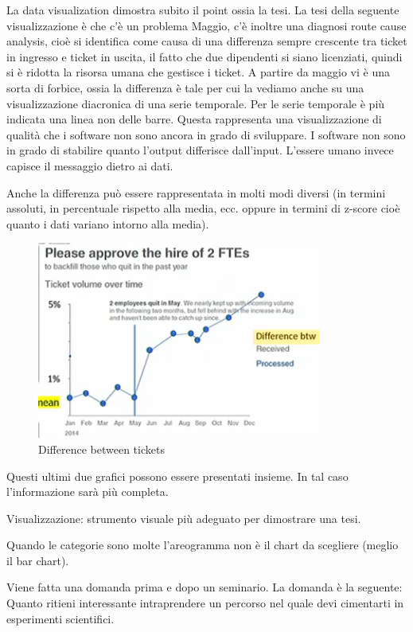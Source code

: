 \documentclass[12pt,a4paper]{report}
\begin{document}
La data visualization dimostra subito il point ossia la tesi. La tesi della seguente visualizzazione è che c'è un problema Maggio, c'è inoltre una diagnosi route cause analysis, cioè si identifica come causa di una differenza sempre crescente tra ticket in ingresso e ticket in uscita, il fatto che due dipendenti si siano licenziati, quindi si è ridotta la risorsa umana che gestisce i ticket. A partire da maggio vi è una sorta di forbice, ossia la differenza è tale per cui la vediamo anche su una visualizzazione diacronica di una serie temporale. Per le serie temporale è più indicata una linea non delle barre. Questa rappresenta una visualizzazione di qualità che i software non sono ancora in grado di sviluppare. I software non sono in grado di stabilire quanto l'output differisce dall'input. L'essere umano invece capisce il messaggio dietro ai dati. 

Anche la differenza può essere rappresentata in molti modi diversi (in termini assoluti, in percentuale rispetto alla media, ecc. oppure in termini di z-score cioè  quanto i dati variano intorno alla media).

\begin{figure}[h]
	\centering
	\includegraphics[width=.6\textwidth]{imgs datavis/differenza.png}\hfil
	
	\caption{Difference between tickets}\label{Difference}
\end{figure}

Questi ultimi due grafici possono essere presentati insieme. In tal caso l'informazione sarà più completa.

Visualizzazione: strumento visuale più adeguato per dimostrare una tesi.  

Quando le categorie sono molte l'areogramma non è il chart da scegliere (meglio il bar chart). 

Viene fatta una domanda prima e dopo un seminario. La domanda è la seguente: Quanto ritieni interessante intraprendere un percorso nel quale devi cimentarti in esperimenti scientifici. 
\end{document}
